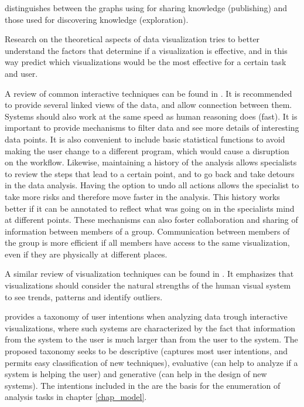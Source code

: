 \autocite{card_structure_1997}	distinguishes between the graphs using for sharing knowledge (publishing) and those used for discovering knowledge (exploration). 


Research on the theoretical aspects of data visualization \autocite{purchase_theoretical_2008} tries to better understand the factors that determine if a visualization is effective, and in this way predict which visualizations would be the most effective for a certain task and user.
	

A review of common interactive techniques can be found in \autocite{heer_interactive_2012}. It is recommended to provide several linked views of the data, and allow connection between them. Systems should also work at the same speed as human reasoning does (fast). It is important to provide mechanisms to filter data and see more details of interesting data points. It is also convenient to include basic statistical functions to avoid making the user change to a different program, which would cause a disruption on the workflow. Likewise, maintaining a history of the analysis allows specialists to review the steps that lead to a certain point, and to go back and take detours in the data analysis. Having the option to undo all actions allows the specialist to take more risks and therefore move faster in the analysis. This history works better if it can be annotated to reflect what was going on in the specialists mind at different points. These mechanisms can also foster collaboration and sharing of information between members of a group. Communication between members of the group is more efficient if all members have access to the same visualization, even if they are physically at different places.

A similar review of visualization techniques can be found in \autocite{heer_tour_2010}. It emphasizes that visualizations should consider the natural strengths of the human visual system to see trends, patterns and identify outliers.



\autocite{yi_toward_2007} provides a taxonomy of user intentions when analyzing data trough interactive visualizations, where such systems are characterized by the fact that information from the system to the user is much larger than from the user to the system. The proposed taxonomy seeks to be descriptive (captures most user intentions, and permits easy classification of new techniques), evaluative (can help to analyze if a system is helping the user) and generative (can help in the design of new systems). The intentions included in the are the basis for the enumeration of analysis tasks in chapter \ref{chap_model}.


